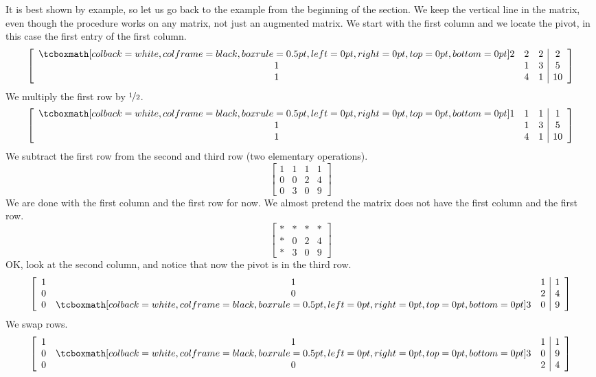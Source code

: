 It is best shown by example, so let us go back to the 
example from the beginning of the section.
We keep the vertical line in the matrix,
even though the procedure works on any matrix, not just
an augmented matrix.
We start with the first column and we locate the pivot, in this
case the first entry of the first column.
\begin{equation*}
\left[
\begin{array}{ccc|c}
\mybxsm{2} & 2 & 2 & 2 \\
1 & 1 & 3 & 5 \\
1 & 4 & 1 & 10
\end{array}
\right]
\end{equation*}
We multiply the first row by
$\nicefrac{1}{2}$.
\begin{equation*}
\left[
\begin{array}{ccc|c}
\mybxsm{1} & 1 & 1 & 1 \\
1 & 1 & 3 & 5 \\
1 & 4 & 1 & 10
\end{array}
\right]
\end{equation*}
We subtract the first row from the second and third row (two elementary
operations).
\begin{equation*}
\left[
\begin{array}{ccc|c}
1 & 1 & 1 & 1 \\
0 & 0 & 2 & 4 \\
0 & 3 & 0 & 9
\end{array}
\right]
\end{equation*}
We are done with the first column and the first row for now.  We almost
pretend the matrix does not have the first column and the first row.
\begin{equation*}
\left[
\begin{array}{ccc|c}
* & * & * & * \\
* & 0 & 2 & 4 \\
* & 3 & 0 & 9
\end{array}
\right]
\end{equation*}
OK\@, look at the second column, and notice that now the pivot is in the
third row.
\begin{equation*}
\left[
\begin{array}{ccc|c}
1 & 1 & 1 & 1 \\
0 & 0 & 2 & 4 \\
0 & \mybxsm{3} & 0 & 9
\end{array}
\right]
\end{equation*}
We swap rows.
\begin{equation*}
\left[
\begin{array}{ccc|c}
1 & 1 & 1 & 1 \\
0 & \mybxsm{3} & 0 & 9 \\
0 & 0 & 2 & 4
\end{array}
\right]
\end{equation*}
